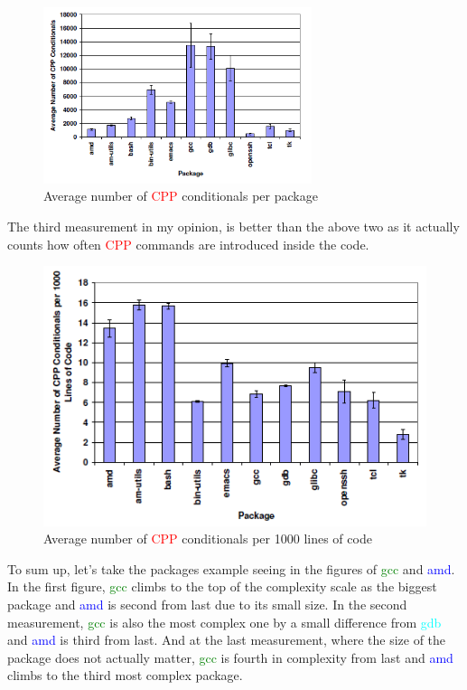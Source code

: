 \documentclass[11pt]{article}
\begin{document}
\begin{figure}[!htb]
\centering
  \includegraphics[width=0.7\textwidth,natwidth=610,natheight=642]{images/measure2.png}
  \caption{Average number of \textcolor{red}{CPP} conditionals per package \cite{zadok2002}}
  \label{fig:measure2}
\end{figure}
\FloatBarrier

The third measurement in my opinion, is better than the above two as it actually counts how often \textcolor{red}{CPP} commands are introduced inside the code.

\begin{figure}[!htb]
\centering
  \includegraphics[width=.7\textwidth,natwidth=610,natheight=642]{images/measure3.png}
  \caption{Average number of \textcolor{red}{CPP} conditionals per 1000 lines
of code \cite{zadok2002}}
  \label{fig:measure3}
\end{figure}
\FloatBarrier
To sum up, let's take the packages example seeing in the figures of \textcolor{green}{gcc} and \textcolor{blue}{amd}. In the first figure, \textcolor{green}{gcc} climbs to the top of the complexity scale as the biggest package and \textcolor{blue}{amd} is second from last due to its small size. In the second measurement, \textcolor{green}{gcc} is also the most complex one by a small difference from \textcolor{cyan}{gdb} and \textcolor{blue}{amd} is third from last. And at the last measurement, where the size of the package does not actually matter, \textcolor{green}{gcc} is fourth in complexity from last and \textcolor{blue}{amd} climbs to the third most complex package.
\end{document}
